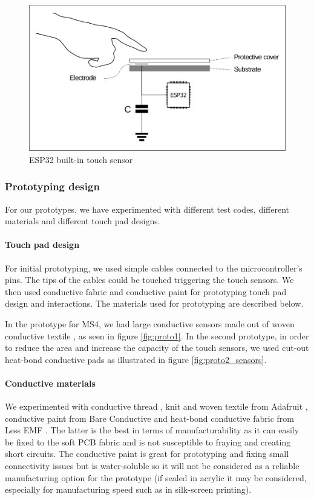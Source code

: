 \begin{figure}[ht]
    \centering
    \includegraphics[scale=0.8]{images/FW/esp_touchsensor.PNG}
    \caption{ESP32 built-in touch sensor}
    \label{fig:esp_touchsens}
\end{figure}

\newpage
    \subsubsection{Prototyping design}
For our prototypes, we have experimented with different test codes, different materials and different touch pad designs.

\paragraph{Touch pad design} For initial prototyping, we used simple cables connected to the microcontroller's pins. The tips of the cables could be touched triggering the touch sensors. We then used conductive fabric and conductive paint for prototyping touch pad design and interactions. The materials used for prototyping are described below.

\medskip
In the prototype for MS4, we had large conductive sensors made out of woven conductive textile \cite{conductivefabric}, as seen in figure \ref{fig:proto1}. In the second prototype, in order to reduce the area and increase the capacity of the touch sensors, we used cut-out heat-bond conductive pads \cite{heatbond} as illustrated in figure \ref{fig:proto2_sensors}.

\paragraph{Conductive materials} We experimented with conductive thread \cite{conductivethread}, knit and woven textile from Adafruit \cite{conductivefabric}, conductive paint from Bare Conductive \cite{bareconductive} and heat-bond conductive fabric from Less EMF \cite{heatbond}. The latter is the best in terms of manufacturability as it can easily be fixed to the soft PCB fabric and is not susceptible to fraying and creating short circuits. The conductive paint is great for prototyping and fixing small connectivity issues but is water-soluble so it will not be considered as a reliable manufacturing option for the prototype (if sealed in acrylic it may be considered, especially for manufacturing speed such as in silk-screen printing). 

